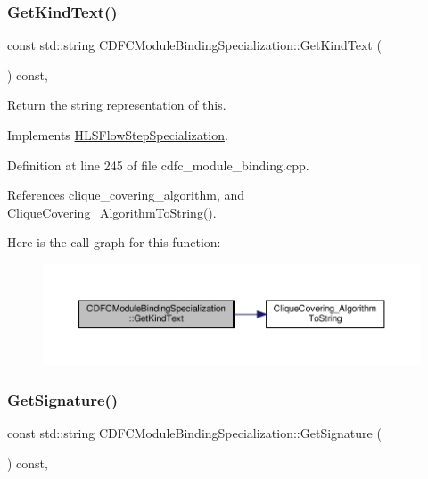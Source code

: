 \subsubsection{\texorpdfstring{Get\+Kind\+Text()}{GetKindText()}}
{\footnotesize\ttfamily const std\+::string C\+D\+F\+C\+Module\+Binding\+Specialization\+::\+Get\+Kind\+Text (\begin{DoxyParamCaption}{ }\end{DoxyParamCaption}) const\hspace{0.3cm}{\ttfamily [override]}, {\ttfamily [virtual]}}



Return the string representation of this. 



Implements \hyperlink{classHLSFlowStepSpecialization_abcad0108fa726ac69986e26671a75ec3}{H\+L\+S\+Flow\+Step\+Specialization}.



Definition at line 245 of file cdfc\+\_\+module\+\_\+binding.\+cpp.



References clique\+\_\+covering\+\_\+algorithm, and Clique\+Covering\+\_\+\+Algorithm\+To\+String().

Here is the call graph for this function\+:
\nopagebreak
\begin{figure}[H]
\begin{center}
\leavevmode
\includegraphics[width=350pt]{d7/d0b/classCDFCModuleBindingSpecialization_a1696e824eb66cbcf6b94992c2bddf943_cgraph}
\end{center}
\end{figure}
\mbox{\label{classCDFCModuleBindingSpecialization_a2e211cebee02224677080272887e4cca}} 
\subsubsection{\texorpdfstring{Get\+Signature()}{GetSignature()}}
{\footnotesize\ttfamily const std\+::string C\+D\+F\+C\+Module\+Binding\+Specialization\+::\+Get\+Signature (\begin{DoxyParamCaption}{ }\end{DoxyParamCaption}) const\hspace{0.3cm}{\ttfamily [override]}, {\ttfamily [virtual]}}



